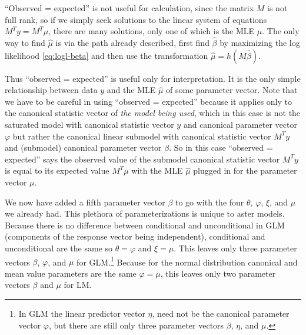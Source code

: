 \documentclass[11pt]{article}
\begin{document}
``Observed = expected'' is not useful for calculation,
since the matrix $M$ is not full rank, so if we simply seek solutions to
the linear system of equations $M^T y = M^T \mu$, there are many solutions,
only one of which is the MLE $\hat{\mu}$.  The only way to find $\hat{\mu}$
is via the path already described, first find $\hat{\beta}$ by maximizing
the log likelihood \eqref{eq:logl-beta} and then use the transformation
$\hat{\mu} = h(M \hat{\beta})$.

Thus ``observed = expected'' is useful only for interpretation.  It is
the only simple relationship between data $y$ and the MLE $\hat{\mu}$ of
some parameter vector.  Note that we have to be careful in using
``observed = expected'' because it applies only to the canonical statistic
vector of \emph{the model being used}, which in this case is not the
saturated model with canonical statistic vector $y$ and canonical parameter
vector $\varphi$ but rather the canonical linear submodel with canonical
statistic vector $M^T y$ and (submodel) canonical parameter vector $\beta$.
So in this case ``observed = expected'' says the observed value of the
submodel canonical statistic vector $M^T y$ is equal to its expected value
$M^T \mu$ with the MLE $\hat{\mu}$ plugged in for the parameter vector $\mu$.


We now have added a fifth parameter vector $\beta$ to go with the four
$\theta$, $\varphi$, $\xi$, and $\mu$ we already had.  This
plethora of parameterizations is unique to aster models.  Because there is
no difference between conditional and unconditional in GLM (components
of the response vector being independent), conditional and unconditional
are the same so $\theta = \varphi$ and $\xi = \mu$.  This
leaves only three parameter vectors $\beta$, $\varphi$, and $\mu$
for GLM.\footnote{In GLM the linear predictor vector $\eta$, need not be
the canonical parameter vector $\varphi$, but there are still only three
parameter vectors $\beta$, $\eta$, and $\mu$.}
Because for the normal distribution canonical
and mean value parameters are the same $\varphi = \mu$,
this leaves only two parameter vectors $\beta$ and $\mu$ for LM.
\end{document}
